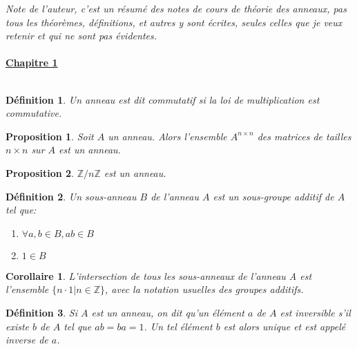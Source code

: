 \documentclass[12pt,a4paper]{article}
\begin{document}

\newcommand{\znz}{\mathbb{Z} / n \mathbb{Z} }
\newcommand{\zmz}{\mathbb{Z} / m \mathbb{Z} }
\newcommand{\zpz}{\mathbb{Z} / p \mathbb{Z} }
\newcommand{\dbs}{\\~\\}
\newtheorem{mydef}{Définition}
\newtheorem{thm}{Théorème}
\newtheorem{prop}{Proposition}
\newtheorem{cor}{Corollaire}
\newtheorem{lem}{Lemme}
\newtheorem{rap}{Rappel}
\newtheorem{rem}{Remarque}


\begin{flushleft}

\textit{Note de l'auteur, c'est un résumé des notes de cours de théorie des anneaux, pas tous les théorèmes, définitions, et autres y sont écrites, seules celles que je veux retenir et qui ne sont pas évidentes.}\dbs

\textbf{\underline{Chapitre 1}}\\~\\

\begin{mydef}
Un anneau est dit commutatif si la loi de multiplication est commutative.
\end{mydef}

\begin{prop} Soit $A$ un anneau. Alors l'ensemble $A^{n \times n}$ des matrices de tailles $n \times n$ sur $A$ est un anneau.\end{prop} 

\begin{prop} $\znz$ est un anneau.
\end{prop}

\begin{mydef} Un sous-anneau $B$ de l'anneau $A$ est un sous-groupe additif de $A$ tel que:
\begin{enumerate}
\item $ \forall a,b \in B, ab \in B $
\item $ 1 \in B$
\end{enumerate} 
\end{mydef}

\begin{cor} 
L'intersection de tous les sous-anneaux de l'anneau A est l'ensemble $ \{ n \cdot 1 | n \in \mathbb{Z} \} $, avec la notation usuelles des groupes additifs.
\end{cor}

\begin{mydef}
Si $A$ est un anneau, on dit qu'un élément $a$ de $A$ est inversible s'il existe $b$ de $A$ tel que $ab=ba=1$. Un tel élément $b$ est alors unique et est appelé inverse de $a$.
\end{mydef}


\end{flushleft}
\end{document}

